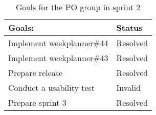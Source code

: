 \begin{table}[H]
    \centering
    \begin{tabular}{|l|l|}
    \hline
    Goals:                                   & Status \\ \hline
    Implement weekplanner\#44                & Resolved  \\ \hline
    Implement weekplanner\#43                & Resolved  \\ \hline
    Prepare release                          & Resolved \\ \hline
    Conduct a usability test                 & Invalid \\ \hline
    Prepare sprint 3                         & Resolved \\ \hline
    \end{tabular}
    \caption{Goals for the PO group in sprint 2}
    \label{PO-goal-sprint-2-review}
\end{table}
